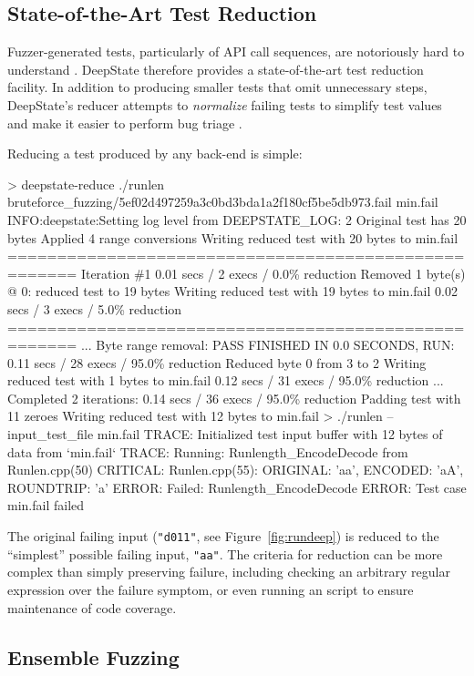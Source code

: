 \documentclass[sigconf]{acmart}
\begin{document}
\subsection{State-of-the-Art Test Reduction}

Fuzzer-generated tests, particularly of API call sequences, are notoriously hard to understand \cite{DD}.  DeepState therefore provides a state-of-the-art test reduction facility.  In addition to producing smaller tests that omit unnecessary steps, DeepState's reducer attempts to \emph{normalize} failing tests \cite{OneTest,MaciverD19} to simplify test values and make it easier to perform bug triage \cite{PLDI13}.

Reducing a test produced by any back-end is simple:

{\scriptsize
  \begin{code}
> deepstate-reduce ./runlen
  bruteforce\_fuzzing/5ef02d497259a3c0bd3bda1a2f180cf5be5db973.fail
  min.fail
INFO:deepstate:Setting log level from DEEPSTATE\_LOG: 2
Original test has 20 bytes
Applied 4 range conversions
Writing reduced test with 20 bytes to min.fail
=====================================================
Iteration \#1 0.01 secs / 2 execs / 0.0\% reduction
Removed 1 byte(s) @ 0: reduced test to 19 bytes
Writing reduced test with 19 bytes to min.fail
 0.02 secs / 3 execs / 5.0\% reduction
=====================================================
...
Byte range removal: PASS FINISHED IN 0.0 SECONDS, RUN: 0.11 secs / 28 execs /
  95.0\% reduction
Reduced byte 0 from 3 to 2
Writing reduced test with 1 bytes to min.fail
 0.12 secs / 31 execs / 95.0\% reduction
...
Completed 2 iterations: 0.14 secs / 36 execs / 95.0\% reduction
Padding test with 11 zeroes
Writing reduced test with 12 bytes to min.fail
> ./runlen --input\_test\_file min.fail
TRACE: Initialized test input buffer with 12 bytes of data from `min.fail`
TRACE: Running: Runlength\_EncodeDecode from Runlen.cpp(50)
CRITICAL: Runlen.cpp(55): ORIGINAL: 'aa', ENCODED: 'aA', ROUNDTRIP: 'a'
ERROR: Failed: Runlength\_EncodeDecode
ERROR: Test case min.fail failed
\end{code}
}

The original failing input ({\tt "d011"}, see Figure~\ref{fig:rundeep}) is reduced to the ``simplest'' possible failing input, {\tt "aa"}.  The criteria for reduction can be more complex than simply preserving failure, including checking an arbitrary regular expression over the failure symptom, or even running an script to ensure maintenance of code coverage.

\subsection{Ensemble Fuzzing}
\end{document}
